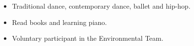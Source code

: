 \documentclass[letterpaper]{engineer_cv} %
\begin{document}
	\begin{longList} %
		\longListItem
			{}
			{}
			{}
			{\begin{itemize}
			  \item Traditional dance, contemporary dance, ballet and hip-hop.
			  \item Read books and learning piano.
              \item Voluntary participant in the Environmental Team.
			\end{itemize}}
			{}
			{}
			\\
	\end{longList}

	\raggedleft{\today}
\end{document}
